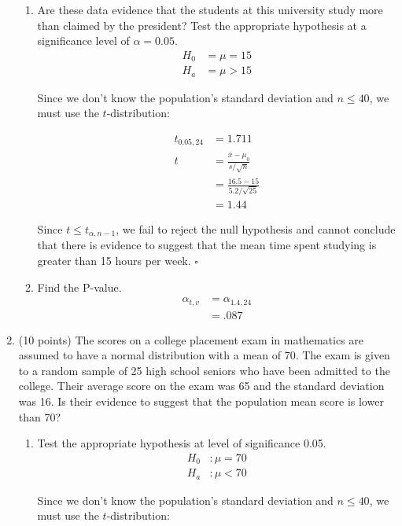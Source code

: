 \documentclass[12pt, letter]{article}
\newenvironment{nscenter}
	{\parskip=0pt\par\nopagebreak\centering}
	{\par\noindent\ignorespacesafterend}
\begin{document}
\begin{enumerate}
	\begin{enumerate}
		\item Are these data evidence that the students at this university study more than claimed by the president? Test the appropriate hypothesis at a significance level of $\alpha = 0.05$.
		\pagebreak
		\begin{align*}
			H_{0} &= \mu = 15 \\
			H_{a} &= \mu > 15
		\end{align*}
		\begin{nscenter}
			Since we don't know the population's standard deviation and $n \leq 40$, we must use the $t$-distribution:
		\end{nscenter}
		\begin{align*}
			t_{0.05, 24} &= 1.711 \\
			t &= \frac{\bar{x} - \mu_{0}}{s / \sqrt{n}} \\
			&= \frac{16.5 - 15}{5.2 / \sqrt{25}} \\
			&= 	1.44
		\end{align*}
		\begin{nscenter}
			Since $t \leq t_{\alpha, n-1}$, we fail to reject the null hypothesis and cannot conclude that there is evidence to suggest that the mean time spent studying is greater than 15 hours per week. $\square$
		\end{nscenter}
		\item Find the P-value.
		\begin{align*}
			\alpha_{t, v} &= \alpha_{1.4, 24} \\
			&= \boxed{.087}
		\end{align*}
	\end{enumerate}
	\item (10 points) The scores on a college placement exam in mathematics are assumed to have a normal distribution with a mean of 70. The exam is given to a random sample of 25 high school seniors who have been admitted to the college. Their average score on the exam was 65 and the standard deviation was 16. Is their evidence to suggest that the population mean score is lower than 70?
	\begin{enumerate}
		\item Test the appropriate hypothesis at level of significance 0.05.
		\begin{align*}
			H_{0}&: \mu = 70 \\
			H_{a}&: \mu < 70
		\end{align*}
		\begin{nscenter}
			Since we don't know the population's standard deviation and $n \leq 40$, we must use the $t$-distribution:

\end{nscenter}
\end{enumerate}
\end{enumerate}
\end{document}
